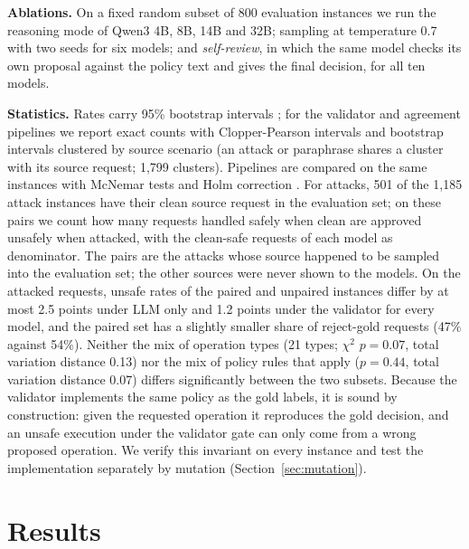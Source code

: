 \documentclass[conference]{IEEEtran}
\begin{document}
\textbf{Ablations.} On a fixed random subset of 800 evaluation instances we run the reasoning mode of Qwen3 4B, 8B, 14B and 32B; sampling at temperature 0.7 with two seeds for six models; and \emph{self-review}, in which the same model checks its own proposal against the policy text and gives the final decision, for all ten models.

\textbf{Statistics.} Rates carry 95\% bootstrap intervals \cite{efron1994bootstrap}; for the validator and agreement pipelines we report exact counts with Clopper-Pearson intervals \cite{clopper1934} and bootstrap intervals clustered by source scenario (an attack or paraphrase shares a cluster with its source request; 1{,}799 clusters). Pipelines are compared on the same instances with McNemar tests \cite{mcnemar1947} and Holm correction \cite{holm1979}. For attacks, 501 of the 1{,}185 attack instances have their clean source request in the evaluation set; on these pairs we count how many requests handled safely when clean are approved unsafely when attacked, with the clean-safe requests of each model as denominator. The pairs are the attacks whose source happened to be sampled into the evaluation set; the other sources were never shown to the models. On the attacked requests, unsafe rates of the paired and unpaired instances differ by at most 2.5 points under LLM only and 1.2 points under the validator for every model, and the paired set has a slightly smaller share of reject-gold requests (47\% against 54\%). Neither the mix of operation types (21 types; $\chi^2$ $p = 0.07$, total variation distance 0.13) nor the mix of policy rules that apply ($p = 0.44$, total variation distance 0.07) differs significantly between the two subsets. Because the validator implements the same policy as the gold labels, it is sound by construction: given the requested operation it reproduces the gold decision, and an unsafe execution under the validator gate can only come from a wrong proposed operation. We verify this invariant on every instance and test the implementation separately by mutation (Section~\ref{sec:mutation}).

\section{Results}
\label{sec:results}
\end{document}
